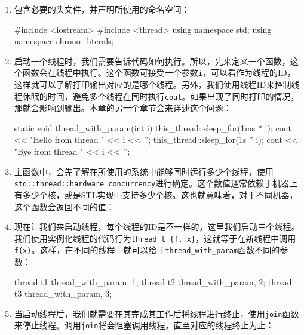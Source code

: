 \begin{enumerate}
\item 包含必要的头文件，并声明所使用的命名空间：

\begin{codebox}[cpp]
#include <iostream>
#include <thread>
using namespace std;
using namespace chrono_literals;
\end{codebox}

\item 启动一个线程时，我们需要告诉代码如何执行。所以，先来定义一个函数，这个函数会在线程中执行。这个函数可接受一个参数\texttt{i}，可以看作为线程的ID，这样就可以了解打印输出对应的是哪个线程。另外，我们使用线程ID来控制线程休眠的时间，避免多个线程在同时执行\texttt{cout}。如果出现了同时打印的情况，那就会影响到输出。本章的另一个章节会来详述这个问题：

\begin{codebox}[cpp]
static void thread_with_param(int i)
{
    this_thread::sleep_for(1ms * i);
    cout << "Hello from thread " << i << '\n';
    this_thread::sleep_for(1s * i);
    cout << "Bye from thread " << i << '\n';
}
\end{codebox}

\item 主函数中，会先了解在所使用的系统中能够同时运行多少个线程，使用\texttt{std::thread::hardware\_concurrency}进行确定。这个数值通常依赖于机器上有多少个核，或是STL实现中支持多少个核。这也就意味着，对于不同机器，这个函数会返回不同的值：

\begin{codebox}[cpp]
int main()
{
    cout << thread::hardware_concurrency()
        << " concurrent threads are supported.\n";
\end{codebox}

\item 现在让我们来启动线程，每个线程的ID是不一样的，这里我们启动三个线程。我们使用实例化线程的代码行为\texttt{thread t \{f, x\}}，这就等于在新线程中调用\texttt{f(x)}。这样，在不同的线程中就可以给于\texttt{thread\_with\_param}函数不同的参数：

\begin{codebox}[cpp]
    thread t1 {thread_with_param, 1};
    thread t2 {thread_with_param, 2};
    thread t3 {thread_with_param, 3};
\end{codebox}

\item 当启动线程后，我们就需要在其完成其工作后将线程进行终止，使用\texttt{join}函数来停止线程。调用\texttt{join}将会阻塞调用线程，直至对应的线程终止为止：


\end{enumerate}
